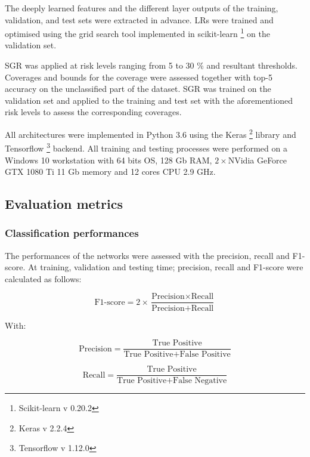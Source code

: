 The deeply learned features and the different layer outputs of the training, validation, and test sets were extracted in advance. LRs were trained and optimised using the grid search tool implemented in scikit-learn \footnote{Scikit-learn v 0.20.2} on the validation set.

SGR was applied at risk levels ranging from 5 to 30 \% and resultant thresholds. Coverages and bounds for the coverage were assessed together with top-5 accuracy on the unclassified part of the dataset. SGR was trained on the validation set and applied to the training and test set with the aforementioned risk levels to assess the corresponding coverages.

All architectures were implemented in Python 3.6 using the Keras \footnote{Keras v 2.2.4} library and Tensorflow \footnote{Tensorflow v 1.12.0} backend. All training and testing processes were performed on a Windows 10 workstation with 64 bits OS, 128 Gb RAM, \(2 \times\)NVidia GeForce GTX 1080 Ti 11 Gb memory and 12 cores CPU 2.9 GHz.

\subsection{Evaluation metrics}\label{chapitre1_5.2}

\subsubsection{Classification performances}\label{chapitre1_5.2.1}

The performances of the networks were assessed with the precision, recall and F1-score. At training, validation and testing time; precision, recall and F1-score were calculated as follows:

\begin{equation}
\text{F1-score}=2\times\frac{\text{Precision}\times\text{Recall}}{\text{Precision}+\text{Recall}}
\end{equation}

With:

\begin{equation}
\text{Precision}=\frac{\text{True Positive}}{\text{True Positive}+\text{False Positive}}
\end{equation}

\begin{equation}
\text{Recall}=\frac{\text{True Positive}}{\text{True Positive}+\text{False Negative}}
\end{equation}


